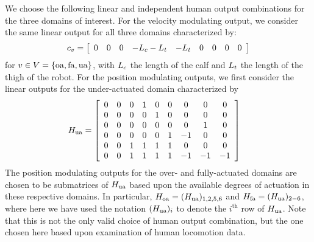 \begin{myexample}
 We choose the following linear and independent human output combinations for the three domains of interest. For the velocity modulating output, we consider the same linear output for all three domains characterized by:
 \begin{eqnarray}
  c_{v} = \left[ \begin{array}{c c c c c c c c c}
  0 &0 &0 & -L_c -L_t & -L_t& 0 & 0 & 0 & 0
 \end{array}\right] 
 \end{eqnarray}
 for $v \in V = \{\mathrm{oa},\mathrm{fa},\mathrm{ua}\}$, with $L_c$ the length of the calf and $L_t$ the length of the thigh of the robot.   For the position modulating outputs, we first consider the linear outputs for the under-actuated domain characterized by
  \begin{align}
  H_{\mathrm{ua}} &= \left[ \begin{array}{c c c c c c c c c}
  0 &0 &0 & 1 & 0 & 0 & 0 & 0 & 0  \\
  0 &0 &0 & 0 & 1 & 0 & 0 & 0 & 0  \\
  0 &0 &0 & 0 & 0 & 0 & 0 & 1 & 0\\
  0 &0 &0 & 0 & 0 & 1 & -1 & 0 & 0\\
  0 &0 &1 & 1 & 1 & 1 & 0 & 0 & 0\\
  0 &0 &1 & 1 & 1 & 1 & -1 & -1 & -1\\
 \end{array}\right]
 \end{align}
 The position modulating outputs for the over- and fully-actuated domains are chosen to be submatrices of $H_{\mathrm{ua}}$ based upon the available degrees of actuation in these respective domains.  In particular, $H_{\mathrm{oa}} = (H_{\mathrm{ua}})_{1,2,5,6}$ and  $H_{\mathrm{fa}} = (H_{\mathrm{ua}})_{2-6}$, where here we have used the notation $(H_{\mathrm{ua}})_{i}$ to denote the $i^{\mathrm{th}}$ row of $H_{\mathrm{ua}}$.
Note that this is not the only valid choice of human output combination, but the one chosen here based upon examination of human locomotion data.
\end{myexample}


